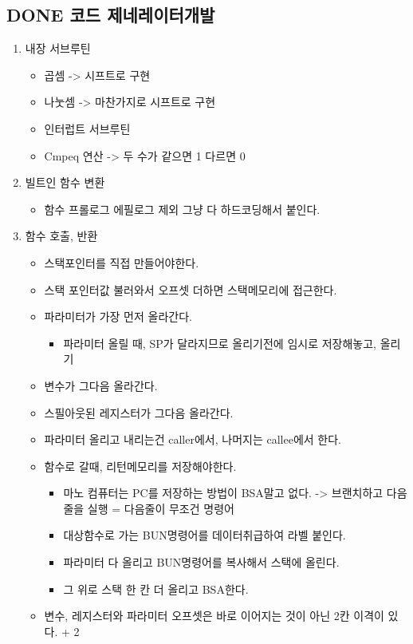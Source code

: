 \documentclass[11pt]{article}
\begin{document}
\subsection{{\bfseries\sffamily DONE} 코드 제네레이터개발}
\label{sec:org84909c0}
\begin{enumerate}
\item 내장 서브루틴
\begin{itemize}
\item 곱셈 -> 시프트로 구현
\item 나눗셈 -> 마찬가지로 시프트로 구현
\item 인터럽트 서브루틴
\item Cmpeq 연산 -> 두 수가 같으면 1 다르면 0
\end{itemize}
\item 빌트인 함수 변환
\begin{itemize}
\item 함수 프롤로그 에필로그 제외 그냥 다 하드코딩해서 붙인다.
\end{itemize}
\item 함수 호출, 반환
\begin{itemize}
\item 스택포인터를 직접 만들어야한다.
\item 스택 포인터값 불러와서 오프셋 더하면 스택메모리에 접근한다.
\item 파라미터가 가장 먼저 올라간다.
\begin{itemize}
\item 파라미터 올릴 때, SP가 달라지므로 올리기전에 임시로 저장해놓고, 올리기
\end{itemize}
\item 변수가 그다음 올라간다.
\item 스필아웃된 레지스터가 그다음 올라간다.
\item 파라미터 올리고 내리는건 caller에서, 나머지는 callee에서 한다.
\item 함수로 갈때, 리턴메모리를 저장해야한다.
\begin{itemize}
\item 마노 컴퓨터는 PC를 저장하는 방법이 BSA말고 없다. -> 브랜치하고 다음 줄을 실행 = 다음줄이 무조건 명령어
\item 대상함수로 가는 BUN명령어를 데이터취급하여 라벨 붙인다.
\item 파라미터 다 올리고 BUN명령어를 복사해서 스택에 올린다.
\item 그 위로 스택 한 칸 더 올리고 BSA한다.
\end{itemize}
\item 변수, 레지스터와 파라미터 오프셋은 바로 이어지는 것이 아닌 2칸 이격이 있다. + 2
\end{itemize}


\end{enumerate}
\end{document}

